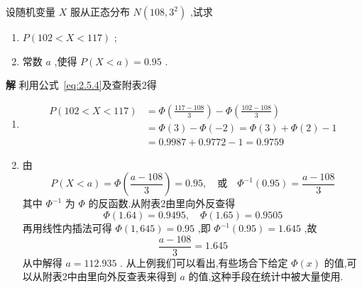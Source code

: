 \begin{example}\label{exam:2.5.2}
	设随机变量 $ X $ 服从正态分布 $ N(108,3^{2}) $ ,试求
	\begin{enumerate}
		\item $ P(102<X<117) $ ;
		\item 常数 $ a $ ,使得 $ P(X<a)=0.95 $ .
	\end{enumerate}
	
	\textbf{解} 利用公式~\ref{eq:2.5.4}及查附表2得
	\begin{enumerate}
		\item \[
		\begin{aligned} P(102<X<117) &=\Phi\left(\frac{117-108}{3}\right)-\Phi\left(\frac{102-108}{3}\right) \\ &=\Phi(3)-\Phi(-2)=\Phi(3)+\Phi(2)-1 \\ &=0.9987+0.9772-1=0.9759 \end{aligned}
		\]
		\item 由
		\[
		P(X<a)=\Phi\left(\frac{a-108}{3}\right)=0.95, \quad \text{或} \quad \Phi^{-1}(0.95)=\frac{a-108}{3}
		\]
		其中 $ \Phi^{-1} $ 为 $ \Phi $ 的反函数.从附表2由里向外反查得
		\[
		\Phi(1.64)=0.9495, \quad \Phi(1.65)=0.9505
		\]
		再用线性内插法可得 $ \Phi(1,645)=0.95 $ ,即 $ \Phi^{-1}(0.95)=1.645 $ ,故
		\[
		\frac{a-108}{3}=1.645
		\]
		从中解得 $ a=112.935 $ .
		从上例我们可以看出,有些场合下给定 $ \Phi(x) $ 的值,可以从附表2中由里向外反查表来得到 $ a $ 的值,这种手段在统计中被大量使用.
	\end{enumerate}
\end{example}

